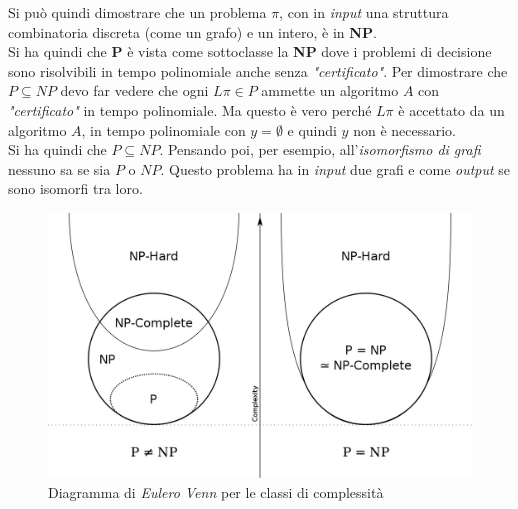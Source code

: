 Si può quindi dimostrare che un problema $\pi$, con in \textit{input} una struttura
combinatoria discreta (come un grafo) e un intero, è in \textbf{NP}.\\
Si ha quindi che \textbf{P} è vista come sottoclasse la \textbf{NP} dove i
problemi di decisione sono risolvibili in tempo polinomiale anche senza
\textit{"certificato"}. Per dimostrare che $P\subseteq NP$ devo far vedere che ogni
$L\pi\in P$ ammette un algoritmo $A$ con \textit{"certificato"} in tempo
polinomiale. Ma questo è vero perché $L\pi$ è accettato da un algoritmo $A$, in
tempo polinomiale con $y=\emptyset$ e quindi $y$ non è necessario.\\
Si ha quindi che $P\subseteq NP$. Pensando poi, per esempio,
all'\textit{isomorfismo di grafi} nessuno sa se sia $P$ o $NP$. Questo
problema ha in \textit{input} due grafi e come \textit{output} se sono isomorfi tra loro.
\begin{figure}[H]
  \centering
  \includegraphics[scale = 0.3]{img/problem.png}
  \caption{Diagramma di \emph{Eulero Venn} per le classi di complessità}
  \label{fig:complexity}
\end{figure}
